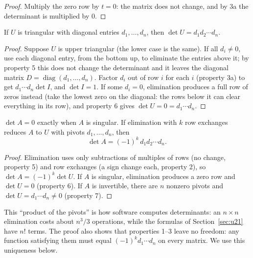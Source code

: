 \begin{proof}
Multiply the zero row by $t=0$: the matrix does not change, and by 3a the determinant is
multiplied by $0$.
\end{proof}

\begin{proposition}\label{prop:u20-triangular}
If $U$ is triangular with diagonal entries $d_1,\dots,d_n$, then $\det U=d_1d_2\cdots d_n$.
\end{proposition}

\begin{proof}
Suppose $U$ is upper triangular (the lower case is the same). If all $d_i\neq 0$, use each
diagonal entry, from the bottom up, to eliminate the entries above it; by property 5 this does
not change the determinant and it leaves the diagonal matrix $D=\operatorname{diag}(d_1,\dots,d_n)$.
Factor $d_i$ out of row $i$ for each $i$ (property 3a) to get $d_1\cdots d_n\det I$, and
$\det I=1$. If some $d_i=0$, elimination produces a full row of zeros instead (take the
lowest zero on the diagonal: the rows below it can clear everything in its row), and property 6
gives $\det U=0=d_1\cdots d_n$.
\end{proof}

\begin{theorem}\label{thm:u20-singular}
$\det A=0$ exactly when $A$ is singular. If elimination with $k$ row exchanges reduces $A$
to $U$ with pivots $d_1,\dots,d_n$, then
\[
  \det A=(-1)^k\,d_1d_2\cdots d_n .
\]
\end{theorem}

\begin{proof}
Elimination uses only subtractions of multiples of rows (no change, property 5) and row
exchanges (a sign change each, property 2), so $\det A=(-1)^k\det U$. If $A$ is singular,
elimination produces a zero row and $\det U=0$ (property 6). If $A$ is invertible, there are
$n$ nonzero pivots and $\det U=d_1\cdots d_n\neq 0$ (property 7).
\end{proof}

This ``product of the pivots'' is how software computes determinants: an $n\times n$
elimination costs about $n^3/3$ operations, while the formulas of Section~\ref{sec:u21} have
$n!$ terms. The proof also shows that properties 1--3 leave no freedom: any function
satisfying them must equal $(-1)^k d_1\cdots d_n$ on every matrix. We use this uniqueness
below.

